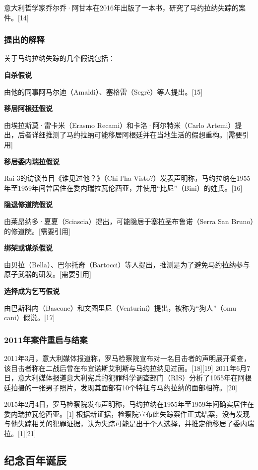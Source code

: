 意大利哲学家乔尔乔·阿甘本在2016年出版了一本书，研究了马约拉纳失踪的案件。[14]
\subsubsection{提出的解释}

关于马约拉纳失踪的几个假说包括：

\textbf{自杀假说} 

   由他的同事阿马尔迪（Amaldi）、塞格雷（Segrè）等人提出。[15]  

\textbf{移居阿根廷假说} 

   由埃拉斯莫·雷卡米（Erasmo Recami）和卡洛·阿尔特米（Carlo Artemi）提出，后者详细推测了马约拉纳可能移居阿根廷并在当地生活的假想重构。[需要引用]  

\textbf{移居委内瑞拉假说}

   Rai 3的访谈节目《谁见过他？》（Chi l'ha Visto?）发表声明称，马约拉纳在1955年至1959年间曾居住在委内瑞拉瓦伦西亚，并使用“比尼”（Bini）的姓氏。[16]  

\textbf{隐退修道院假说}

   由莱昂纳多·夏夏（Sciascia）提出，可能隐居于塞拉圣布鲁诺（Serra San Bruno）的修道院。[需要引用]  

\textbf{绑架或谋杀假说} 

   由贝拉（Bella）、巴尔托奇（Bartocci）等人提出，推测是为了避免马约拉纳参与原子武器的研发。[需要引用]  

\textbf{选择成为乞丐假说}  

   由巴斯科内（Bascone）和文图里尼（Venturini）提出，被称为“狗人”（omu cani）假说。[17]  
\subsubsection{2011年案件重启与结案 }
2011年3月，意大利媒体报道称，罗马检察院宣布对一名目击者的声明展开调查，该目击者称在二战后曾在布宜诺斯艾利斯与马约拉纳见过面。[18][19] 2011年6月7日，意大利媒体报道意大利宪兵的犯罪科学调查部门（RIS）分析了1955年在阿根廷拍摄的一张男子照片，发现其面部有10个特征与马约拉纳的面部相符。[20]  

2015年2月4日，罗马检察院发布声明称，马约拉纳在1955年至1959年间确实居住在委内瑞拉瓦伦西亚。[1] 根据新证据，检察院宣布此失踪案件正式结案，没有发现与他失踪相关的犯罪证据，认为失踪可能是出于个人选择，并推定他移居了委内瑞拉。[1][21]
\subsection{纪念百年诞辰}

